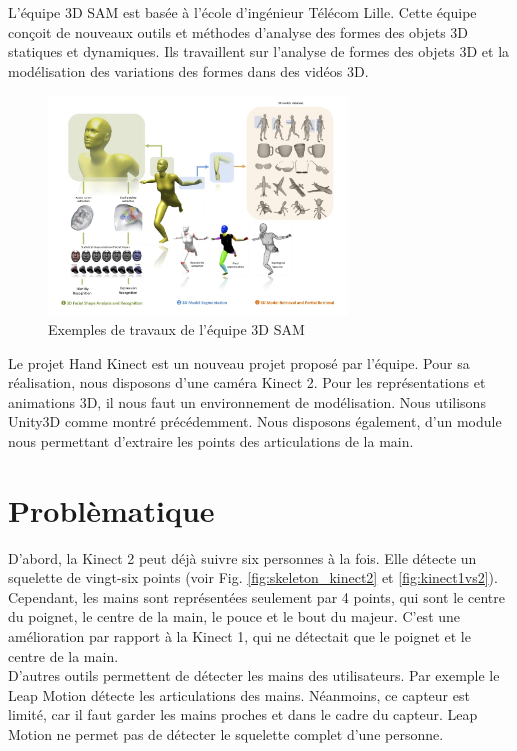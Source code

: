 L'équipe 3D SAM est basée à l'école d'ingénieur Télécom Lille. 
Cette équipe conçoit de nouveaux outils et méthodes d'analyse des 
formes des objets 3D statiques et dynamiques. Ils travaillent sur 
l'analyse de formes des objets 3D et la modélisation des variations 
des formes dans des vidéos 3D.

\begin{figure}[H]
  \begin{center}
    \includegraphics[width=300px]{images/accueil-illus.jpg}
    \caption{Exemples de travaux de l'équipe 3D SAM}
  \end{center}
\end{figure}

Le projet \og Hand Kinect \fg est un nouveau projet proposé par 
l'équipe.
Pour sa réalisation, nous disposons d'une caméra Kinect 2. 
Pour les représentations et animations 3D, il nous faut un environnement 
de modélisation. Nous utilisons Unity3D comme montré précédemment. 
Nous disposons également, d'un module nous permettant d'extraire les 
points des articulations de la main.

\section{Problèmatique}
D'abord, la Kinect 2 peut déjà suivre six personnes à la fois. Elle 
détecte un squelette de vingt-six points (voir Fig. 
\ref{fig:skeleton_kinect2} et \ref{fig:kinect1vs2}). Cependant, les 
mains sont représentées seulement par 4 points, qui sont le centre du
poignet, le centre de la main, le pouce et le bout du majeur. C'est une amélioration par rapport à la Kinect 1, qui ne détectait que le poignet 
et le centre de la main.\\

D'autres outils permettent de détecter les mains des utilisateurs. Par 
exemple le Leap Motion détecte les articulations des mains. Néanmoins,
ce capteur est limité, car il faut garder les mains proches et dans le 
cadre du capteur. Leap Motion ne permet pas de détecter le squelette 
complet d'une personne.\\


